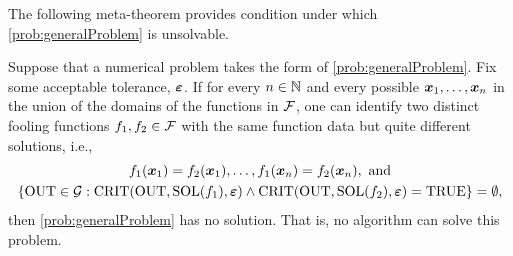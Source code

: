 The following meta-theorem provides condition under which \cref{prob:generalProblem} is unsolvable.

\begin{theorem} \label{thm:impossible}
Suppose that a numerical problem takes the form of \cref{prob:generalProblem}.  Fix some acceptable tolerance, $\boldsymbol{\varepsilon}$.  If for every $n \in \mathbb{N}$ and every possible $\boldsymbol{x}_1, \ldots, \boldsymbol{x}_n$ in the union of the domains of the functions in $\mathcal{F}$, one can identify two distinct fooling functions $f_1, f_2 \in \mathcal{F}$ with the same function data but quite different solutions, i.e.,
\begin{gather} \label{eq:bumpfunctionsmatch}
    f_1(\boldsymbol{x}_1) = f_2(\boldsymbol{x}_1), \ldots,  f_1(\boldsymbol{x}_n) = f_2(\boldsymbol{x}_n), \text{ and} \\
    \label{eq:solutionsfar}
    \{\operatorname{OUT} \in \mathcal{G} : \operatorname{CRIT}(\operatorname{OUT},\operatorname{SOL}(f_1),\boldsymbol{\varepsilon}) \land \operatorname{CRIT}(\operatorname{OUT},\operatorname{SOL}(f_2),\boldsymbol{\varepsilon}) = \textup{TRUE} \} =\emptyset,
\end{gather}
then \cref{prob:generalProblem} has no solution.  That is, no algorithm can solve this problem.
\end{theorem}